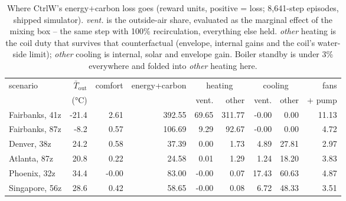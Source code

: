 \begin{table}[t]
\centering
\small
\begin{tabular}{lrrrrrrrr}
\toprule
scenario & $\bar T_\mathrm{out}$ & comfort & energy+carbon & \multicolumn{2}{c}{heating} & \multicolumn{2}{c}{cooling} & fans \\
 & (°C) & & & vent. & other & vent. & other & + pump \\
\midrule
Fairbanks, 41z & -21.4 & 2.61 & 392.55 & 69.65 & 311.77 & -0.00 & 0.00 & 11.13 \\
Fairbanks, 87z & -8.2 & 0.57 & 106.69 & 9.29 & 92.67 & -0.00 & 0.00 & 4.72 \\
Denver, 38z & 24.2 & 0.58 & 37.39 & 0.00 & 1.73 & 4.89 & 27.81 & 2.97 \\
Atlanta, 87z & 20.8 & 0.22 & 24.58 & 0.01 & 1.29 & 1.24 & 18.20 & 3.83 \\
Phoenix, 32z & 34.4 & -0.00 & 83.00 & -0.00 & 0.07 & 17.43 & 60.63 & 4.87 \\
Singapore, 56z & 28.6 & 0.42 & 58.65 & -0.00 & 0.08 & 6.72 & 48.33 & 3.51 \\
\bottomrule
\end{tabular}
\caption{Where CtrlW's energy+carbon loss goes (reward units, positive = loss; 8{,}641-step episodes, shipped simulator). \emph{vent.} is the outside-air share, evaluated as the marginal effect of the mixing box -- the same step with 100\% recirculation, everything else held. \emph{other} heating is the coil duty that survives that counterfactual (envelope, internal gains and the coil's water-side limit); \emph{other} cooling is internal, solar and envelope gain. Boiler standby is under 3\% everywhere and folded into \emph{other} heating here.}
\label{tab:energyflow}
\end{table}
